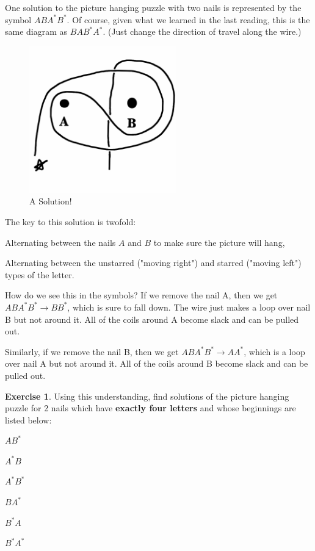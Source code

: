 \documentclass[12pt,letterpaper]{article}
\theoremstyle{definition}
\newtheorem{exercise}[question]{Exercise}
\begin{document}
One solution to the picture hanging puzzle with two nails is represented by the symbol $ABA^*B^*$. Of course, given what we learned in the last reading, this is the same diagram as $BAB^*A^*$. (Just change the direction of travel along the wire.)
\begin{figure}[h]
\centering
\includegraphics[height=2.5in]{phppics/ABAsBs.png}
\caption{A Solution!}
\end{figure}
The key to this solution is twofold:
\begin{compactitem}
\item Alternating between the nails $A$ and $B$ to make sure the picture will hang,
\item Alternating between the unstarred ("moving right") and starred ("moving left") types of the letter.
\end{compactitem}
How do we see this in the symbols?
If we remove the nail A, then we get $ABA^*B^* \longrightarrow BB^*$, which is sure to fall down.
The wire just makes a loop over nail B but not around it.
All of the coils around A become slack and can be pulled out.

Similarly, if we remove the nail B, then we get $ABA^*B^* \longrightarrow AA^*$, which is a loop over nail A but not around it.
All of the coils around B become slack and can be pulled out.

\begin{exercise}
Using this understanding, find solutions of the picture hanging puzzle for 2 nails which have \textbf{exactly four letters} and whose beginnings are listed below:
\begin{compactitem}
\begin{multicols}{3}
\item $AB^*$
\item $A^*B$
\item $A^*B^*$
\item $BA^*$
\item $B^*A$
\item $B^*A^*$
\end{multicols}
\end{compactitem}
\end{exercise}
\end{document}
